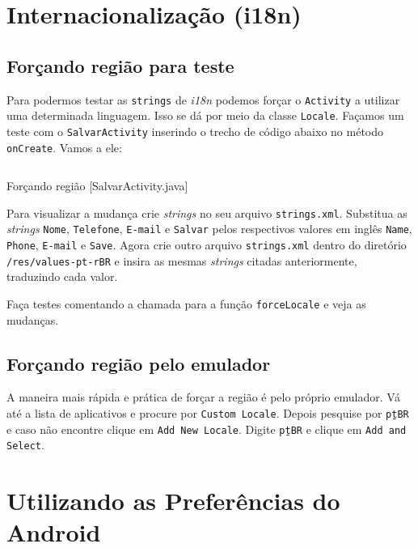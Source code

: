\section{Internacionalização (i18n)}

\subsection{Forçando região para teste}

Para podermos testar as \texttt{strings} de \textit{i18n} podemos forçar o \texttt{Activity}
a utilizar uma determinada linguagem. Isso se dá por meio da classe \texttt{Locale}.
Façamos um teste com o \texttt{SalvarActivity} inserindo o trecho de código abaixo no
método \texttt{onCreate}. Vamos a ele:

\begin{listing}[H]
  \inputminted[linenos=true,frame=bottomline,tabsize=3]{ java }{ source/SalvarActivity-5.java }
  \caption{Forçando região [SalvarActivity.java]}
\end{listing}

Para visualizar a mudança crie \textit{strings} no seu arquivo \texttt{strings.xml}. Substitua
as \textit{strings} \texttt{Nome}, \texttt{Telefone}, \texttt{E-mail} e \texttt{Salvar} pelos
respectivos valores em inglês \texttt{Name}, \texttt{Phone}, \texttt{E-mail} e \texttt{Save}.
Agora crie outro arquivo \texttt{strings.xml} dentro do diretório \texttt{/res/values-pt-rBR} e
insira as mesmas \textit{strings} citadas anteriormente, traduzindo cada valor.

Faça testes comentando a chamada para a função \texttt{forceLocale} e veja as mudanças.

\subsection{Forçando região pelo emulador}

A maneira mais rápida e prática de forçar a região é pelo próprio emulador. Vá até a lista de
aplicativos e procure por \texttt{Custom Locale}. Depois pesquise por \texttt{pt\b{ }BR} e caso não encontre
clique em \texttt{Add New Locale}. Digite \texttt{pt\b{ }BR} e clique em \texttt{Add and Select}.

\section{Utilizando as Preferências do Android}

